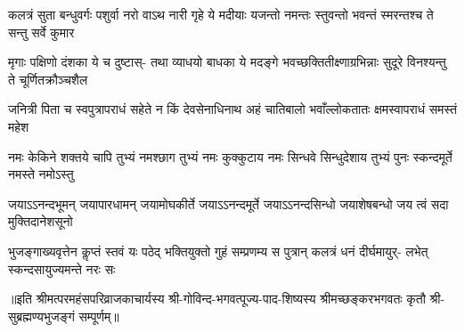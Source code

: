 \fourlineindentedshloka
{कलत्रं सुता बन्धुवर्गः पशुर्वा}
{नरो वाऽथ नारी गृहे ये मदीयाः}
{यजन्तो नमन्तः स्तुवन्तो भवन्तं}
{स्मरन्तश्च ते सन्तु सर्वे कुमार}

\fourlineindentedshloka
{मृगाः पक्षिणो दंशका ये च दुष्टास्-}
{तथा व्याधयो बाधका ये मदङ्गे}
{भवच्छक्तितीक्ष्णाग्रभिन्नाः सुदूरे}
{विनश्यन्तु ते चूर्णितक्रौञ्चशैल}

\fourlineindentedshloka
{जनित्री पिता च स्वपुत्रापराधं}
{सहेते न किं देवसेनाधिनाथ}
{अहं चातिबालो भवाँल्लोकतातः}
{क्षमस्वापराधं समस्तं महेश}

\fourlineindentedshloka
{नमः केकिने शक्तये चापि तुभ्यं}
{नमश्छाग तुभ्यं नमः कुक्कुटाय}
{नमः सिन्धवे सिन्धुदेशाय तुभ्यं}
{पुनः स्कन्दमूर्ते नमस्ते नमोऽस्तु}

\fourlineindentedshloka
{जयाऽऽनन्दभूमन् जयापारधामन्}
{जयामोघकीर्ते जयाऽऽनन्दमूर्ते}
{जयाऽऽनन्दसिन्धो जयाशेषबन्धो}
{जय त्वं सदा मुक्तिदानेशसूनो}

\fourlineindentedshloka
{भुजङ्गाख्यवृत्तेन कॢप्तं स्तवं यः}
{पठेद् भक्तियुक्तो गुहं सम्प्रणम्य}
{स पुत्रान् कलत्रं धनं दीर्घमायुर्-}
{लभेत् स्कन्दसायुज्यमन्ते नरः सः}

॥इति श्रीमत्परमहंसपरिव्राजकाचार्यस्य श्री-गोविन्द-भगवत्पूज्य-पाद-शिष्यस्य
श्रीमच्छङ्करभगवतः कृतौ श्री-सुब्रह्मण्यभुजङ्गं सम्पूर्णम्॥
